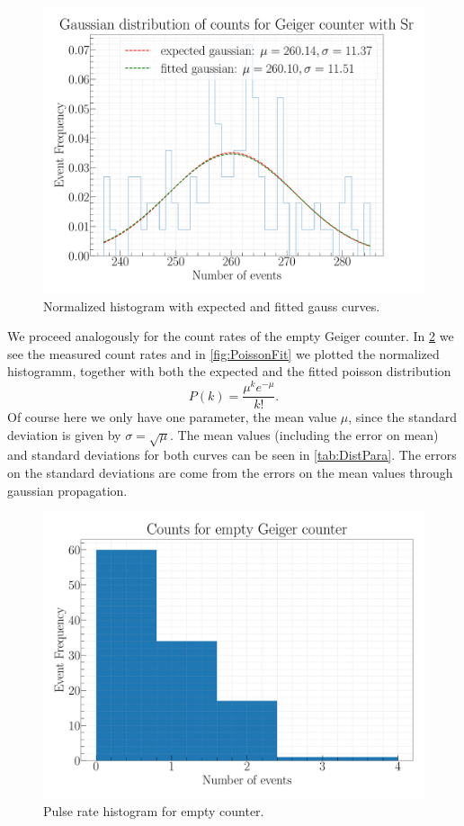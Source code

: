 \begin{figure}[H]
\centering
\includegraphics[width=\textwidth]{../Figures/Geiger_gauss_fit.pdf}
\caption{Normalized histogram with expected and fitted gauss curves.}
\label{fig:GaussFit}
\end{figure}

We proceed analogously for the count rates of the empty Geiger counter. In \cref{fig:PoissonHist} we see the measured count rates and in \cref{fig:PoissonFit} we plotted the normalized histogramm, together with both the expected and the fitted poisson distribution
\begin{equation}
P(k) = \frac{\mu^k e^{-\mu}}{k!}.
\end{equation}
Of course here we only have one parameter, the mean value $\mu$, since the standard deviation is given by $\sigma = \sqrt{\mu}$. The mean values (including the error on mean) and standard deviations for both curves can be seen in \cref{tab:DistPara}. The errors on the standard deviations are come from the errors on the mean values through gaussian propagation.

\begin{figure}[H]
\centering
\includegraphics[width=\textwidth]{../Figures/Geiger_poisson_histogram.pdf}
\caption{Pulse rate histogram for empty counter.}
\label{fig:PoissonHist}
\end{figure}

